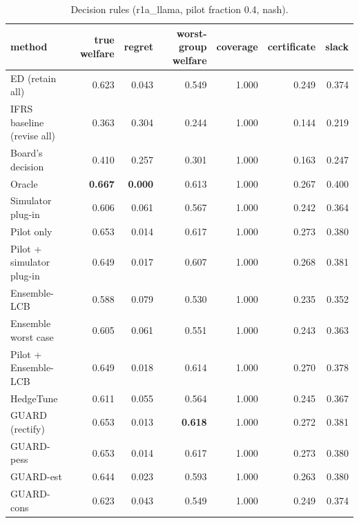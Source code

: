 \begin{table}[t]
\centering
\small
\begin{tabular}{lrrrrrr}
\toprule
method & true welfare & regret & worst-group welfare & coverage & certificate & slack \\
\midrule
ED (retain all) & 0.623 & 0.043 & 0.549 & 1.000 & 0.249 & 0.374 \\
IFRS baseline (revise all) & 0.363 & 0.304 & 0.244 & 1.000 & 0.144 & 0.219 \\
Board's decision & 0.410 & 0.257 & 0.301 & 1.000 & 0.163 & 0.247 \\
Oracle & \textbf{0.667} & \textbf{0.000} & 0.613 & 1.000 & 0.267 & 0.400 \\
Simulator plug-in & 0.606 & 0.061 & 0.567 & 1.000 & 0.242 & 0.364 \\
Pilot only & 0.653 & 0.014 & 0.617 & 1.000 & 0.273 & 0.380 \\
Pilot + simulator plug-in & 0.649 & 0.017 & 0.607 & 1.000 & 0.268 & 0.381 \\
Ensemble-LCB & 0.588 & 0.079 & 0.530 & 1.000 & 0.235 & 0.352 \\
Ensemble worst case & 0.605 & 0.061 & 0.551 & 1.000 & 0.243 & 0.363 \\
Pilot + Ensemble-LCB & 0.649 & 0.018 & 0.614 & 1.000 & 0.270 & 0.378 \\
HedgeTune & 0.611 & 0.055 & 0.564 & 1.000 & 0.245 & 0.367 \\
GUARD (rectify) & 0.653 & 0.013 & \textbf{0.618} & 1.000 & 0.272 & 0.381 \\
GUARD-pess & 0.653 & 0.014 & 0.617 & 1.000 & 0.273 & 0.380 \\
GUARD-est & 0.644 & 0.023 & 0.593 & 1.000 & 0.263 & 0.380 \\
GUARD-cons & 0.623 & 0.043 & 0.549 & 1.000 & 0.249 & 0.374 \\
\bottomrule
\end{tabular}
\caption{Decision rules (r1a\_llama, pilot fraction 0.4, nash).}
\label{tab:methods-nash}
\end{table}
